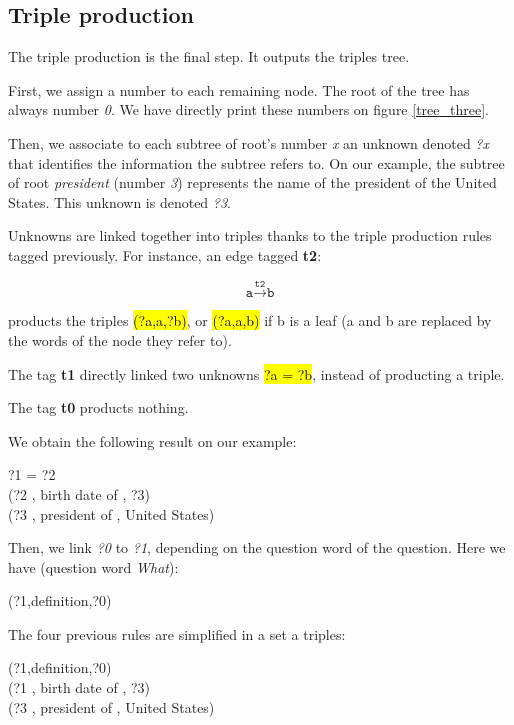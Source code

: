 
\subsection{Triple production}

The triple production is the final step. It outputs the triples tree.

First, we assign a number to each remaining node. The root of the tree has always number \textit{0}. We have directly print these numbers on figure \ref{tree_three}.

Then, we associate to each subtree of root's number \textit{x} an unknown denoted \textit{?x} that identifies the information the subtree refers to. On our example, the subtree of root \textit{president} (number \textit{3}) represents the name of the president of the United States. This unknown is denoted \textit{?3}.

Unknowns are linked together into triples thanks to the triple production rules tagged previously. For instance, an  edge tagged \textbf{t2}:

\[\texttt{a}\xrightarrow{\texttt{t2}}\texttt{b}\]

products the triples \hl{(?a,a,?b)}, or \hl{(?a,a,b)} if b is a leaf (a and b are replaced by the words of the node they refer to).

The tag \textbf{t1} directly linked two unknowns \hl{?a = ?b}, instead of producting a triple.

The tag \textbf{t0} products nothing.

We obtain the following result on our example:

\begin{center}
 ?1 = ?2 ~\\
 (?2 , birth date of , ?3) ~\\
 (?3 , president of , United States)
\end{center}

Then, we link \textit{?0} to \textit{?1}, depending on the question word of the question. Here we have (question word \textit{What}):
\begin{center}
 (?1,definition,?0)
\end{center}

The four previous rules are simplified in a set a triples:

\begin{center}
 (?1,definition,?0) ~\\
 (?1 , birth date of , ?3) ~\\
 (?3 , president of , United States)
\end{center}

